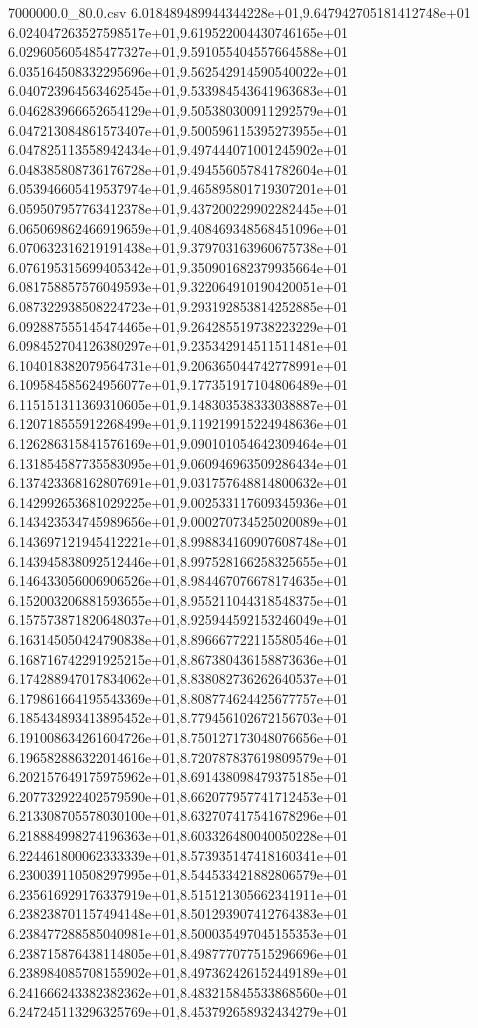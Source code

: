 \begin{filecontents*}{7000000.0_80.0.csv}
6.018489489944344228e+01,9.647942705181412748e+01
6.024047263527598517e+01,9.619522004430746165e+01
6.029605605485477327e+01,9.591055404557664588e+01
6.035164508332295696e+01,9.562542914590540022e+01
6.040723964563462545e+01,9.533984543641963683e+01
6.046283966652654129e+01,9.505380300911292579e+01
6.047213084861573407e+01,9.500596115395273955e+01
6.047825113558942434e+01,9.497444071001245902e+01
6.048385808736176728e+01,9.494556057841782604e+01
6.053946605419537974e+01,9.465895801719307201e+01
6.059507957763412378e+01,9.437200229902282445e+01
6.065069862466919659e+01,9.408469348568451096e+01
6.070632316219191438e+01,9.379703163960675738e+01
6.076195315699405342e+01,9.350901682379935664e+01
6.081758857576049593e+01,9.322064910190420051e+01
6.087322938508224723e+01,9.293192853814252885e+01
6.092887555145474465e+01,9.264285519738223229e+01
6.098452704126380297e+01,9.235342914511511481e+01
6.104018382079564731e+01,9.206365044742778991e+01
6.109584585624956077e+01,9.177351917104806489e+01
6.115151311369310605e+01,9.148303538333038887e+01
6.120718555912268499e+01,9.119219915224948636e+01
6.126286315841576169e+01,9.090101054642309464e+01
6.131854587735583095e+01,9.060946963509286434e+01
6.137423368162807691e+01,9.031757648814800632e+01
6.142992653681029225e+01,9.002533117609345936e+01
6.143423534745989656e+01,9.000270734525020089e+01
6.143697121945412221e+01,8.998834160907608748e+01
6.143945838092512446e+01,8.997528166258325655e+01
6.146433056006906526e+01,8.984467076678174635e+01
6.152003206881593655e+01,8.955211044318548375e+01
6.157573871820648037e+01,8.925944592153246049e+01
6.163145050424790838e+01,8.896667722115580546e+01
6.168716742291925215e+01,8.867380436158873636e+01
6.174288947017834062e+01,8.838082736262640537e+01
6.179861664195543369e+01,8.808774624425677757e+01
6.185434893413895452e+01,8.779456102672156703e+01
6.191008634261604726e+01,8.750127173048076656e+01
6.196582886322014616e+01,8.720787837619809579e+01
6.202157649175975962e+01,8.691438098479375185e+01
6.207732922402579590e+01,8.662077957741712453e+01
6.213308705578030100e+01,8.632707417541678296e+01
6.218884998274196363e+01,8.603326480040050228e+01
6.224461800062333339e+01,8.573935147418160341e+01
6.230039110508297995e+01,8.544533421882806579e+01
6.235616929176337919e+01,8.515121305662341911e+01
6.238238701157494148e+01,8.501293907412764383e+01
6.238477288585040981e+01,8.500035497045155353e+01
6.238715876438114805e+01,8.498777077515296696e+01
6.238984085708155902e+01,8.497362426152449189e+01
6.241666243382382362e+01,8.483215845533868560e+01
6.247245113296325769e+01,8.453792658932434279e+01

\end{filecontents*}

